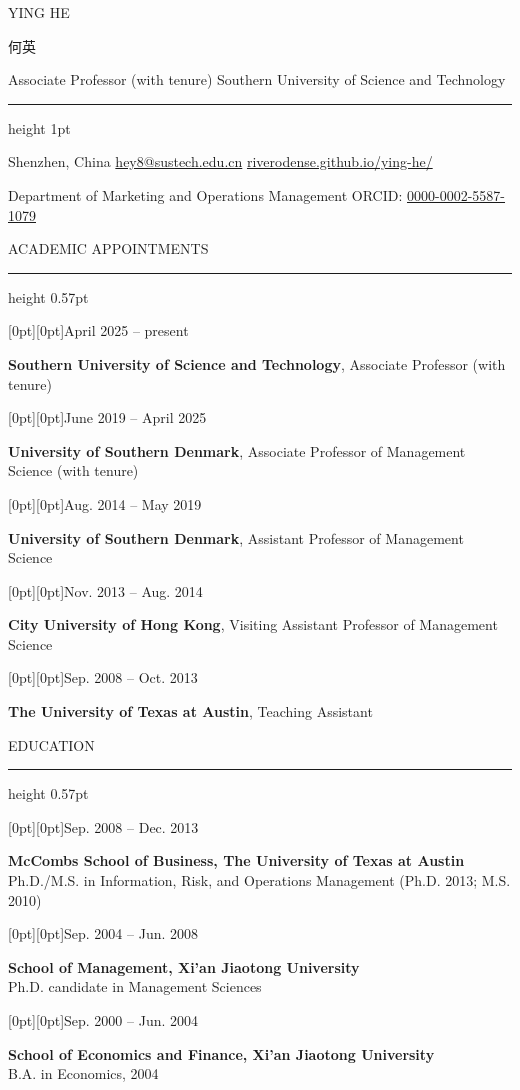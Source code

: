 \documentclass[10pt,a4paper]{article}
\newcommand{\cvsection}[1]{%
  \par\addvspace{8.1pt}\needspace{3\baselineskip}%
  {\headingfont\fontsize{10.35}{12}\selectfont\color{navy}\MakeUppercase{#1}}\par\vspace{3.4pt}%
  {\color{ruleblue}\hrule height 0.57pt}\vspace{5pt}%
}
\newcommand{\cvdated}[3][1.41in]{%
  \par\noindent\begin{minipage}[t]{#1}\raggedright\raisebox{0.8pt}[0pt][0pt]{\metafont\fontsize{8.55}{11.6}\selectfont\color{slate}#2}\end{minipage}%
  \hspace{0.11in}%
  \begin{minipage}[t]{\dimexpr\linewidth-#1-0.11in\relax}\raggedright #3\end{minipage}%
  \par\vspace{2.4pt}%
}
\newcommand{\cvcontact}[1]{{\metafont\fontsize{8.4}{10.5}\selectfont #1}}
\begin{document}
\begin{center}
  {\headingfont\fontsize{22}{26}\selectfont\color{navy} YING HE}\par\vspace{1pt}
  {\chinesenamefont\fontsize{12}{15}\selectfont\color{navy} 何英}\par\vspace{3pt}
  {\metafont\fontsize{9}{11}\selectfont\color{slate} Associate Professor (with tenure) \quad\textbullet\quad Southern University of Science and Technology}\par
  \vspace{6pt}
  {\color{navy}\hrule height 1pt}\vspace{6.4pt}
  \cvcontact{Shenzhen, China \quad\textcolor{ruleblue}{\textbar}\quad
    \href{mailto:hey8@sustech.edu.cn}{hey8@sustech.edu.cn} \quad\textcolor{ruleblue}{\textbar}\quad
    \href{https://riverodense.github.io/ying-he/}{riverodense.github.io/ying-he/}}\par\vspace{2pt}
  \cvcontact{Department of Marketing and Operations Management \quad\textcolor{ruleblue}{\textbar}\quad
    ORCID: \href{https://orcid.org/0000-0002-5587-1079}{0000-0002-5587-1079}}
\end{center}
\vspace{1.5pt}
\cvsection{Academic Appointments}
\cvdated{April 2025 – present}{\textbf{Southern University of Science and Technology}, Associate Professor (with tenure)}
\cvdated{June 2019 – April 2025}{\textbf{University of Southern Denmark}, Associate Professor of Management Science (with tenure)}
\cvdated{Aug. 2014 – May 2019}{\textbf{University of Southern Denmark}, Assistant Professor of Management Science}
\cvdated{Nov. 2013 – Aug. 2014}{\textbf{City University of Hong Kong}, Visiting Assistant Professor of Management Science}
\cvdated{Sep. 2008 – Oct. 2013}{\textbf{The University of Texas at Austin}, Teaching Assistant}
\cvsection{Education}
\cvdated{Sep. 2008 – Dec. 2013}{\textbf{McCombs School of Business, The University of Texas at Austin}\\Ph.D./M.S. in Information, Risk, and Operations Management (Ph.D. 2013; M.S. 2010)}
\cvdated{Sep. 2004 – Jun. 2008}{\textbf{School of Management, Xi'an Jiaotong University}\\Ph.D. candidate in Management Sciences}
\cvdated{Sep. 2000 – Jun. 2004}{\textbf{School of Economics and Finance, Xi'an Jiaotong University}\\B.A. in Economics, 2004}
\end{document}
